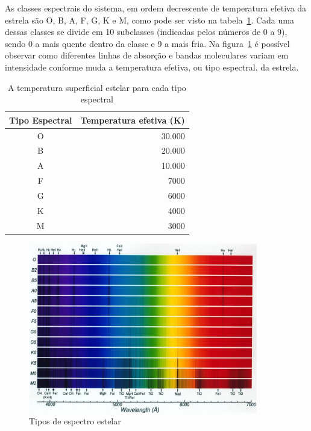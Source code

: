 As classes espectrais do sistema, em ordem decrescente de temperatura efetiva da estrela são O, B, A, F, G, K e M, como pode ser visto na tabela~\ref{tab:stellar-temperatures}. Cada uma dessas classes se divide em 10 subclasses (indicadas pelos números de 0 a 9), sendo 0 a mais quente dentro da classe e 9 a mais fria.
Na figura~\ref{fig:stellar-spectrum-types} é possível observar como diferentes linhas de absorção e bandas moleculares variam em intensidade conforme muda a temperatura efetiva, ou tipo espectral, da estrela.

\begin{table}[htb]
\centering
\begin{tabular}{|c|r|}
\hline
\textbf{Tipo Espectral} & \textbf{Temperatura efetiva (K)} \\ \hline
O                       & 30.000                               \\ \hline
B                       & 20.000                               \\ \hline
A                       & 10.000                               \\ \hline
F                       & 7000                                 \\ \hline
G                       & 6000                                 \\ \hline
K                       & 4000                                 \\ \hline
M                       & 3000                                 \\ \hline
\end{tabular}
\caption{A temperatura superficial estelar para cada tipo espectral \citep{iag-stellar-temps}}\label{tab:stellar-temperatures}
\end{table}

\begin{figure}[htb]
\centering
\includegraphics[width=10cm]{figuras/Spectra_Briley.jpg}
\caption{Tipos de espectro estelar \citep{astroprinceton}}
\label{fig:stellar-spectrum-types}
\end{figure}

